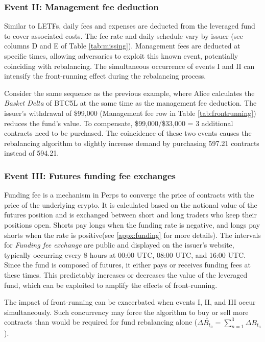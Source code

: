 \subsubsection{Event II: Management fee deduction}
Similar to LETFs, daily fees and expenses are deducted from the leveraged fund to cover associated costs. The fee rate and daily schedule vary by issuer (see columns D and E of Table \ref{tab:missing}). Management fees are deducted at specific times, allowing adversaries to exploit this known event, potentially coinciding with rebalancing. The simultaneous occurrence of events I and II can intensify the front-running effect during the rebalancing process.

\begin{example}
	Consider the same sequence as the previous example, where Alice calculates the \textsl{Basket Delta} of BTC5L at the same time as the management fee deduction. The issuer's withdrawal of \$99,000 (Management fee row in Table \ref{tab:frontrunning}) reduces the fund's value. To compensate, \$99,000/\$33,000 = 3 additional contracts need to be purchased. The coincidence of these two events causes the rebalancing algorithm to slightly increase demand by purchasing 597.21 contracts instead of 594.21.
\end{example}

\subsubsection{Event III: Futures funding fee exchanges}\label{fundingfee}
Funding fee is a mechanism in Perps to converge the price of contracts with the price of the underlying crypto. It is calculated based on the notional value of the futures position and is exchanged between short and long traders who keep their positions open. Shorts pay longs when the funding rate is negative, and longs pay shorts when the rate is positive(see \ref{appx:funding} for more details). The intervals for \textsl{Funding fee exchange} are public and displayed on the issuer's website, typically occurring every 8 hours at 00:00 UTC, 08:00 UTC, and 16:00 UTC. Since the fund is composed of futures, it either pays or receives funding fees at these times. This predictably increases or decreases the value of the leveraged fund, which can be exploited to amplify the effects of front-running.

The impact of front-running can be exacerbated when events I, II, and III occur simultaneously. Such concurrency may force the algorithm to buy or sell more contracts than would be required for fund rebalancing alone (\ie $\Delta{\tilde{B_{t_n}}}=\sum_{n=1}^{3}{\Delta{B_{t_{n}}}}$).

